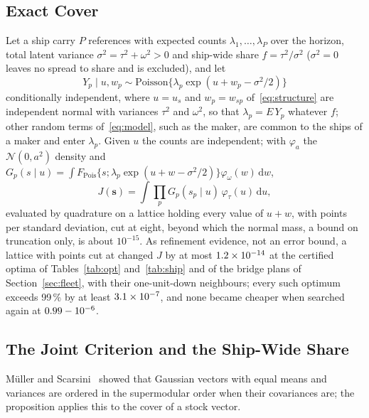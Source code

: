 \subsection{Exact Cover}
Let a ship carry $P$ references with expected counts
$\lambda_1,\dots,\lambda_P$ over the horizon, total latent variance
$\sigma^2=\tau^2+\omega^2>0$ and ship-wide share $f=\tau^2/\sigma^2$
($\sigma^2=0$ leaves no spread to share and is excluded), and let
\begin{equation}
Y_p\mid u,w_p\sim\mathrm{Poisson}\big\{\lambda_p\exp(u+w_p-\sigma^2/2)\big\}
\label{eq:multi}
\end{equation}
conditionally independent, where $u=u_s$ and $w_p=w_{sp}$
of~\eqref{eq:structure} are independent normal with variances $\tau^2$ and
$\omega^2$, so that $\lambda_p=E\,Y_p$ whatever $f$; other random terms
of~\eqref{eq:model}, such as the maker, are common to the ships of a maker and
enter $\lambda_p$. Given $u$
the counts are independent; with $\varphi_a$ the $\mathcal N(0,a^2)$ density
and $G_p(s\mid u)=\int F_{\mathrm{Pois}}\{s;\lambda_p\exp(u+w-\sigma^2/2)\}
\varphi_\omega(w)\,\mathrm dw$,
\begin{equation}
J(\mathbf s)=\int\textstyle\prod_{p}G_p(s_p\mid u)\,\varphi_\tau(u)\,\mathrm du,
\label{eq:jointexact}
\end{equation}
evaluated by quadrature on a lattice holding every value of $u+w$, with
\caPerSd{} points per standard deviation, cut at eight, beyond which the
normal mass, a bound on truncation only, is about $10^{-15}$. As refinement
evidence, not an error bound, a lattice with \caFinePerSd{} points cut at
\caFineWidth{} changed $J$ by at most $1.2\times 10^{-14}$ at the \caN{} certified optima
of Tables~\ref{tab:opt} and~\ref{tab:ship} and of the bridge plans of
Section~\ref{sec:fleet}, with their one-unit-down neighbours; every such
optimum exceeds 99\,\% by at least $3.1\times 10^{-7}$, and none became cheaper when searched
again at $0.99-10^{-6}$.

\subsection{The Joint Criterion and the Ship-Wide Share}
M\"uller and Scarsini~\cite{muller2000} showed that Gaussian vectors with equal
means and variances are ordered in the supermodular order when their
covariances are; the proposition applies this to the cover of a stock vector.

